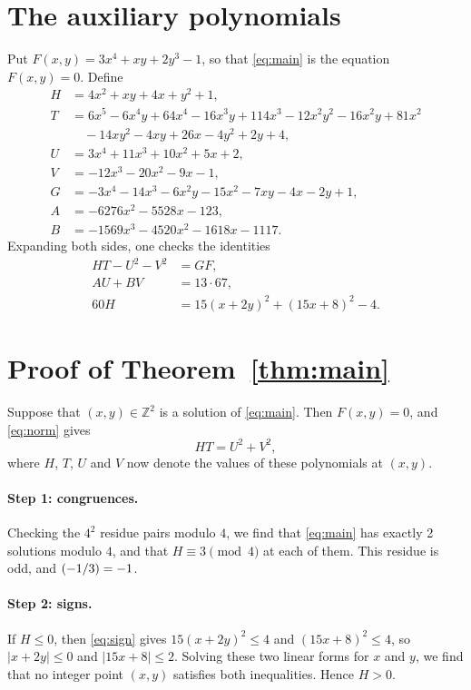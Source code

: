 \documentclass[11pt]{article}
\newcommand{\Z}{\mathbb{Z}}
\newcommand{\leg}[2]{\mathchoice{\biggl(\dfrac{#1}{#2}\biggr)}{(#1/#2)}{(#1/#2)}{(#1/#2)}}
\begin{document}
\section{The auxiliary polynomials}

Put $F(x,y)=3x^{4}+xy+2y^{3}-1$, so that \eqref{eq:main} is the equation $F(x,y)=0$. Define
\begin{align*}
H&=4x^{2}+xy+4x+y^{2}+1,\\
T&=6x^{5}-6x^{4}y+64x^{4}-16x^{3}y+114x^{3}-12x^{2}y^{2}-16x^{2}y+81x^{2}\\
&\quad-14xy^{2}-4xy+26x-4y^{2}+2y+4,\\
U&=3x^{4}+11x^{3}+10x^{2}+5x+2,\\
V&=-12x^{3}-20x^{2}-9x-1,\\
G&=-3x^{4}-14x^{3}-6x^{2}y-15x^{2}-7xy-4x-2y+1,\\
A&=-6276x^{2}-5528x-123,\\
B&=-1569x^{3}-4520x^{2}-1618x-1117.
\end{align*}
Expanding both sides, one checks the identities
\begin{align}
HT-U^2-V^2&=GF,\label{eq:norm}\\
AU+BV&=13\cdot 67,\label{eq:bezout}\\
60H&=15(x+2y)^2+(15x+8)^2-4.\label{eq:sign}
\end{align}

\section{Proof of Theorem~\ref{thm:main}}

Suppose that $(x,y)\in\Z^2$ is a solution of \eqref{eq:main}. Then $F(x,y)=0$, and \eqref{eq:norm} gives
\begin{equation}\label{eq:HT}
HT=U^2+V^2,
\end{equation}
where $H$, $T$, $U$ and $V$ now denote the values of these polynomials at $(x,y)$.

\paragraph{Step 1: congruences.} Checking the $4^2$ residue pairs modulo $4$, we find that \eqref{eq:main} has exactly 2 solutions modulo $4$, and that $H\equiv3\pmod{4}$ at each of them. This residue is odd, and $\leg{-1}{3}=-1$.

\paragraph{Step 2: signs.} If $H\leq0$, then \eqref{eq:sign} gives $15(x+2y)^2\leq 4$ and $(15x+8)^2\leq 4$, so $|x+2y|\leq0$ and $|15x+8|\leq2$. Solving these two linear forms for $x$ and $y$, we find that no integer point $(x,y)$ satisfies both inequalities. Hence $H>0$.
\end{document}
